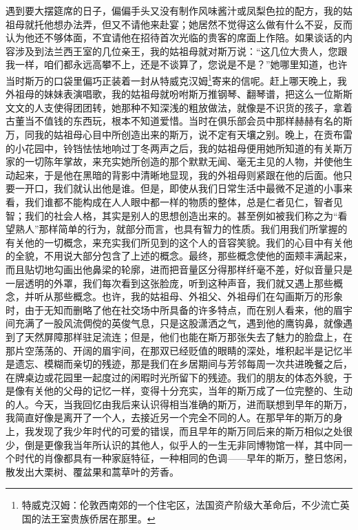 \par 遇到要大摆筵席的日子，偏偏手头又没有制作风味酱汁或凤梨色拉的配方，我的姑祖母就托他想办法弄，但又不请他来赴宴；她居然不觉得这么做有什么不妥，反而认为他还不够体面，不宜请他在招待首次光临的贵客的席面上作陪。如果谈话的内容涉及到法兰西王室的几位亲王，我的姑祖母就对斯万说：“这几位大贵人，您跟我一样，咱们都永远高攀不上，还是不谈算了，您说是不是？”她哪里知道，也许当时斯万的口袋里偏巧正装着一封从特威克汉姆\footnote{特威克汉姆：伦敦西南郊的一个住宅区，法国资产阶级大革命后，不少流亡英国的法王室贵族侨居在那里。}寄来的信呢。赶上哪天晚上，我外祖母的妹妹表演唱歌，我的姑祖母就吩咐斯万推钢琴、翻琴谱，把这么一位斯斯文文的人支使得团团转，她那种不知深浅的粗放做法，就像是不识货的孩子，拿着古董当不值钱的东西玩，根本不知道爱惜。当时在俱乐部会员中那样赫赫有名的斯万，同我的姑祖母心目中所创造出来的斯万，说不定有天壤之别。晚上，在贡布雷的小花园中，铃铛怯怯地响过丁冬两声之后，我的姑祖母便用她所知道的有关斯万家的一切陈年掌故，来充实她所创造的那个默默无闻、毫无主见的人物，并使他生动起来，于是他在黑暗的背影中清晰地显现，我的外祖母则紧跟在他的后面。他只要一开口，我们就认出他是谁。但是，即使从我们日常生活中最微不足道的小事来看，我们谁都不能构成在人人眼中都一样的物质的整体，总是仁者见仁，智者见智；我们的社会人格，其实是别人的思想创造出来的。甚至例如被我们称之为“看望熟人”那样简单的行为，就部分而言，也具有智力的性质。我们用我们所掌握的有关他的一切概念，来充实我们所见到的这个人的音容笑貌。我们的心目中有关他的全貌，不用说大部分包含了上述的概念。最终，那些概念使他的面颊丰满起来，而且贴切地勾画出他鼻梁的轮廓，进而把音量区分得那样纤毫不差，好似音量只是一层透明的外罩，我们每次看到这张脸庞，听到这种声音，我们就又遇上那些概念，并听从那些概念。也许，我的姑祖母、外祖父、外祖母们在勾画斯万的形象时，由于无知而删略了他在社交场中所具备的许多特点，而在别人看来，他的眉宇间充满了一股风流倜傥的英俊气息，只是这股潇洒之气，遇到他的鹰钩鼻，就像遇到了天然屏障那样驻足流连；但是，他们也能在斯万那张失去了魅力的脸盘上，在那片空荡荡的、开阔的眉宇间，在那双已经贬值的眼睛的深处，堆积起半是记忆半是遗忘、模糊而亲切的残迹，那是我们在乡居期间与芳邻每周一次共进晚餐之后，在牌桌边或花园里一起度过的闲暇时光所留下的残迹。我们的朋友的体态外貌，于是像有关他的父母的记忆一样，变得十分充实，当年的斯万成了一位完整的、生动的人。今天，当我回忆由我后来认识得相当准确的斯万，进而联想到早年的斯万，我简直好像是离开了一个人，去接近另一个完全不同的人。在那早年的斯万的身上，我发现了我少年时代的可爱的错误，而且早年的斯万同后来的斯万相似之处很少，倒是更像我当年所认识的其他人，似乎人的一生无非同博物馆一样，其中同一个时代的肖像都具有一种家庭特征，一种相同的色调——早年的斯万，整日悠闲，散发出大栗树、覆盆果和蒿草叶的芳香。
